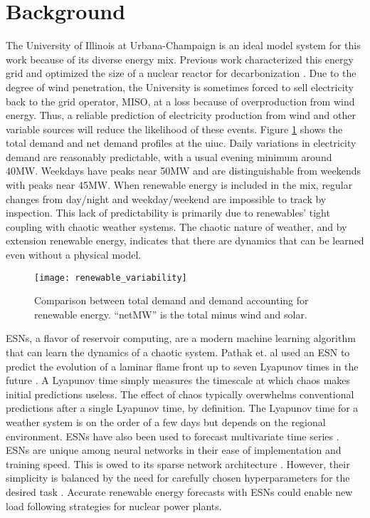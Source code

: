 \section{Background}


The University of Illinois at Urbana-Champaign is an ideal model system for
this work because of its diverse energy mix. Previous work
characterized this energy grid and optimized the size of a nuclear reactor
for decarbonization \cite{dotson_optimal_2020}. Due to the degree of wind
penetration, the University is sometimes
forced to sell electricity back to the grid operator, MISO, at a loss because
of overproduction
from wind energy. Thus, a reliable prediction of electricity production from
wind and other variable sources will reduce the likelihood of these events.
Figure \ref{figure:vre} shows the total demand and net demand profiles at the
\gls{uiuc}.
Daily variations in electricity demand are reasonably predictable, with a
usual evening minimum around 40MW. Weekdays have peaks near 50MW and are
distinguishable from weekends with peaks near 45MW. When renewable energy is
included in the mix, regular changes from day/night and weekday/weekend are
impossible to track by inspection. This lack of predictability is primarily due
to renewables' tight coupling with chaotic weather systems. The chaotic nature
of weather, and by extension renewable energy, indicates that there are
dynamics that can be learned even without a physical model.
\begin{figure}[h]
  \centering
  \texttt{[image: renewable\_variability]}
  \caption{Comparison between total demand and demand accounting for renewable
   energy. ``netMW'' is the total minus wind and solar.}
  \label{figure:vre}
\end{figure}

\glspl{ESN}, a flavor of reservoir computing, are a modern
machine learning algorithm that can learn the dynamics of a chaotic system.
Pathak et. al used an \gls{ESN} to predict the
evolution of a laminar flame front up to seven Lyapunov
times in the future \cite{pathak_model-free_2018, wikner_combining_2020}. A
Lyapunov time simply measures the timescale at which chaos makes initial
predictions useless. The effect of chaos typically overwhelms conventional
predictions after a single Lyapunov time, by definition.
The Lyapunov time for a weather system is on the order of a few days but
depends on the regional environment. \glspl{ESN} have also been used to
forecast multivariate time series \cite{bianchi_reservoir_2020}. \glspl{ESN}
are unique among neural
networks in their ease of implementation and training speed. This is owed to its
sparse network architecture \cite{pathak_model-free_2018,
wikner_combining_2020, vannitsem_predictability_2017}. However,
their simplicity is balanced by the need for carefully chosen hyperparameters
for the desired task \cite{lukosevicius_practical_2012}.
Accurate renewable energy forecasts with \glspl{ESN} could enable new load
following strategies for nuclear power plants.
